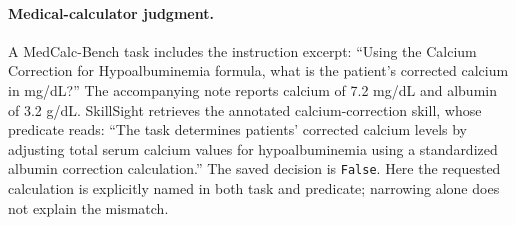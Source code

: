 \paragraph{Medical-calculator judgment.}
A MedCalc-Bench task includes the instruction excerpt: ``Using the Calcium Correction for Hypoalbuminemia formula, what is the patient's corrected calcium in mg/dL?'' The accompanying note reports calcium of 7.2 mg/dL and albumin of 3.2 g/dL. SkillSight retrieves the annotated calcium-correction skill, whose predicate reads: ``The task determines patients' corrected calcium levels by adjusting total serum calcium values for hypoalbuminemia using a standardized albumin correction calculation.'' The saved decision is \texttt{False}. Here the requested calculation is explicitly named in both task and predicate; narrowing alone does not explain the mismatch.

